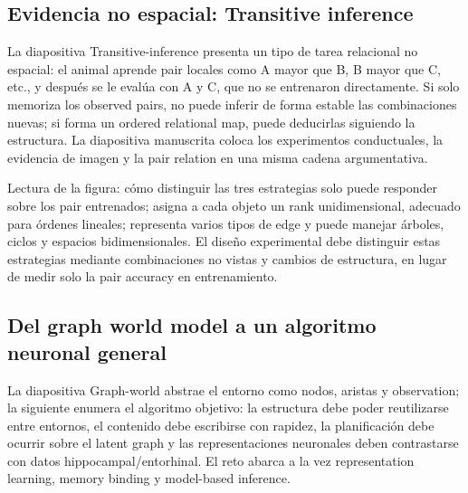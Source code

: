 \subsection{Evidencia no espacial: Transitive inference}

La diapositiva Transitive-inference presenta un tipo de tarea relacional no espacial: el animal aprende pair locales como A mayor que B, B mayor que C, etc., y después se le evalúa con A y C, que no se entrenaron directamente. Si solo memoriza los observed pairs, no puede inferir de forma estable las combinaciones nuevas; si forma un ordered relational map, puede deducirlas siguiendo la estructura. La diapositiva manuscrita coloca los experimentos conductuales, la evidencia de imagen y la pair relation en una misma cadena argumentativa.



\begin{knowledgebox}{Lectura de la figura: cómo distinguir las tres estrategias}
 solo puede responder sobre los pair entrenados;  asigna a cada objeto un rank unidimensional, adecuado para órdenes lineales;  representa varios tipos de edge y puede manejar árboles, ciclos y espacios bidimensionales. El diseño experimental debe distinguir estas estrategias mediante combinaciones no vistas y cambios de estructura, en lugar de medir solo la pair accuracy en entrenamiento.
\end{knowledgebox}

\subsection{Del graph world model a un algoritmo neuronal general}

La diapositiva Graph-world abstrae el entorno como nodos, aristas y observation; la siguiente enumera el algoritmo objetivo: la estructura debe poder reutilizarse entre entornos, el contenido debe escribirse con rapidez, la planificación debe ocurrir sobre el latent graph y las representaciones neuronales deben contrastarse con datos hippocampal/entorhinal. El reto abarca a la vez representation learning, memory binding y model-based inference.

